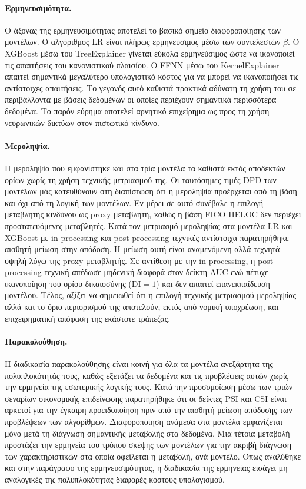 \paragraph{Ερμηνευσιμότητα.}
Ο άξονας της ερμηνευσιμότητας αποτελεί το βασικό σημείο διαφοροποίησης των
μοντέλων. Ο αλγόριθμος LR είναι πλήρως ερμηνεύσιμος μέσω των συντελεστών
$\beta$. Ο XGBoost μέσω του TreeExplainer γίνεται εύκολα ερμηνεύσιμος ώστε να
ικανοποιεί τις απαιτήσεις του κανονιστικού πλαισίου. Ο FFNN μέσω του
KernelExplainer απαιτεί σημαντικά μεγαλύτερο υπολογιστικό κόστος για να μπορεί
να ικανοποιήσει τις αντίστοιχες απαιτήσεις. Το γεγονός αυτό καθιστά πρακτικά
αδύνατη τη χρήση του σε περιβάλλοντα με βάσεις δεδομένων οι οποίες περιέχουν
σημαντικά περισσότερα δεδομένα. Το παρόν εύρημα αποτελεί αρνητικό επιχείρημα
ως προς τη χρήση νευρωνικών δικτύων στον πιστωτικό κίνδυνο.

\paragraph{Μεροληψία.}
Η μεροληψία που εμφανίστηκε και στα τρία μοντέλα τα καθιστά εκτός αποδεκτών
ορίων χωρίς τη χρήση τεχνικής μετριασμού της. Οι ταυτόσημες τιμές DPD των
μοντέλων μάς κατευθύνουν στη διαπίστωση ότι η μεροληψία προέρχεται από τη
βάση και όχι από τη λογική των μοντέλων. Εν μέρει σε αυτό συνέβαλε η επιλογή
μεταβλητής κινδύνου ως proxy μεταβλητή, καθώς η βάση FICO HELOC δεν περιέχει
προστατευόμενες μεταβλητές. Κατά τον μετριασμό μεροληψίας στα μοντέλα LR και
XGBoost με in-processing και post-processing τεχνικές αντίστοιχα παρατηρήθηκε
αισθητή μείωση στην απόδοση. Η μείωση αυτή είναι αναμενόμενη αλλά τεχνητά
υψηλή λόγω της proxy μεταβλητής. Σε αντίθεση με την in-processing, η
post-processing τεχνική απέδωσε μηδενική διαφορά στον δείκτη AUC ενώ πέτυχε
ικανοποίηση του ορίου δικαιοσύνης ($\text{DI} = 1$) και δεν απαιτεί
επανεκπαίδευση μοντέλου. Τέλος, αξίζει να σημειωθεί ότι η επιλογή τεχνικής
μετριασμού μεροληψίας αλλά και το όριο περιορισμού της αποτελούν, εκτός από
νομική υποχρέωση, και επιχειρηματική απόφαση της εκάστοτε τράπεζας.

\paragraph{Παρακολούθηση.}
Η διαδικασία παρακολούθησης είναι κοινή για όλα τα μοντέλα ανεξάρτητα της
πολυπλοκότητάς τους, καθώς εξετάζει τα δεδομένα και τις προβλέψεις αυτών
χωρίς την ερμηνεία της εσωτερικής λογικής τους. Κατά την προσομοίωση μέσω
των τριών σεναρίων οικονομικής επιδείνωσης παρατηρήθηκε ότι οι δείκτες PSI
και CSI είναι αρκετοί για την έγκαιρη προειδοποίηση πριν από την αισθητή
μείωση απόδοσης των προβλέψεων των αλγορίθμων. Διαφοροποίηση ανάμεσα στα
μοντέλα εμφανίζεται μόνο μετά τη διάγνωση σημαντικής μεταβολής στα δεδομένα.
Μια τέτοια μεταβολή προστάζει την ερμηνεία του τρόπου σκέψης των μοντέλων για
την ακριβή διάγνωση των χαρακτηριστικών στα οποία οφείλεται η μεταβολή, ανά
μοντέλο. Όπως αναλύθηκε και στην παράγραφο της ερμηνευσιμότητας, η διαδικασία
της ερμηνείας εισάγει μη αναλογικές της πολυπλοκότητας διαφορές κόστους
υπολογισμού.

